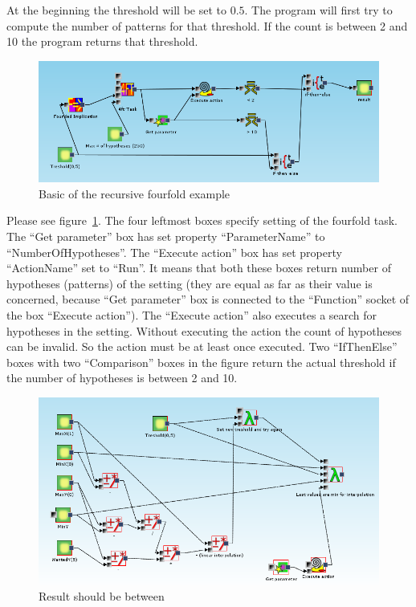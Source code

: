 \documentclass[a4paper,12pt]{book}
\begin{document}
At the beginning the threshold will be set to $0.5$. The program will first try to compute the number of patterns for that threshold. If the count is between 2 and 10 the program returns that threshold.   

\begin{figure}
	\includegraphics[width=1\textwidth]{exampleMainMiningPart}
	\caption{Basic of the recursive fourfold example}
	\label{fig:basicRecursiveExample}
\end{figure}

Please see figure~\ref{fig:basicRecursiveExample}. The four leftmost boxes specify setting of the fourfold task. The ``Get parameter'' box has set property ``ParameterName'' to ``NumberOfHypotheses''. The ``Execute action'' box has set property ``ActionName'' set to ``Run''. It means that both these boxes return number of hypotheses (patterns) of the setting (they are equal as far as their value is concerned, because ``Get parameter'' box is connected to the ``Function'' socket of the box ``Execute action''). The ``Execute action'' also executes a search for hypotheses in the setting. Without executing the action the count of hypotheses can be invalid. So the action must be at least once executed. Two ``IfThenElse'' boxes with two ``Comparison'' boxes in the figure return the actual threshold if the number of hypotheses is between 2 and 10.

\begin{figure}
	\includegraphics[width=1\textwidth]{exampleMainRecursionPart}
	\caption{Result should be between}
	\label{fig:resultBetween}
\end{figure}
\end{document}
